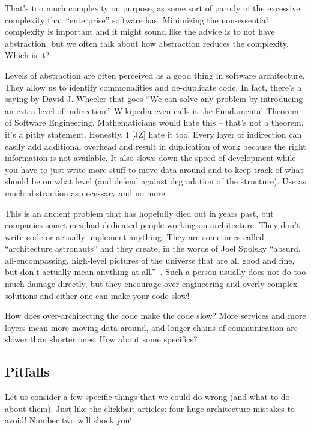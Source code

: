  
That's too much complexity on purpose, as some sort of parody of the excessive complexity that ``enterprise'' software has. Minimizing the non-essential complexity is important and it might sound like the advice is to not have abstraction, but we often talk about how abstraction reduces the complexity. Which is it?

Levels of abstraction are often perceived as a good thing in software architecture. They allow us to identify commonalities and de-duplicate code. In fact, there's a saying by David J. Wheeler that goes ``We can solve any problem by introducing an extra level of indirection.'' Wikipedia even calls it the Fundamental Theorem of Software Engineering. Mathematicians would hate this -- that's not a theorem, it's a pithy statement. Honestly, I [JZ] hate it too! Every layer of indirection can easily add additional overhead and result in duplication of work because the right information is not available. It also slows down the speed of development while you have to just write more stuff to move data around and to keep track of what should be on what level (and defend against degradation of the structure). Use as much abstraction as necessary and no more.

This is an ancient problem that has hopefully died out in years past, but companies sometimes had dedicated people working on architecture. They don't write code or actually implement anything. They are sometimes called ``architecture astronauts'' and they create, in the words of Joel Spolsky ``absurd, all-encompassing, high-level pictures of the universe that are all good and fine, but don't actually mean anything at all.''~\cite{archastro}. Such a person usually does not do too much damage directly, but they encourage over-engineering and overly-complex solutions and either one can make your code slow!

How does over-architecting the code make the code slow? More services and more layers mean more moving data around, and longer chains of communication are slower than shorter ones. How about some specifics?

\subsection*{Pitfalls}

Let us consider a few specific things that we could do wrong (and what to do about them). Just like the clickbait articles: four huge architecture mistakes to avoid! Number two will shock you! 

